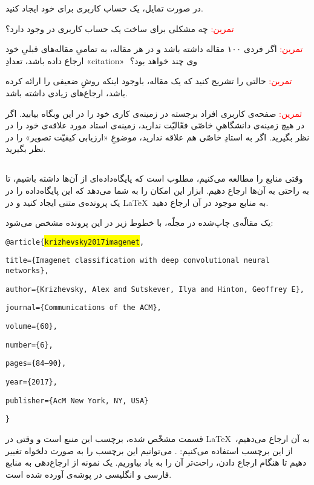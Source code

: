 \documentclass{article}
\begin{document}
\noindent در صورت تمایل، یک حساب کاربری برای خود ایجاد کنید.

\noindent \textcolor{red}{تمرین:} چه مشکلی برای ساخت یک حساب کاربری در \href{https://www.researchgate.net}{} وجود دارد؟

\noindent \textcolor{red}{تمرین:} اگر فردی ۱۰۰ مقاله داشته باشد و در هر مقاله، به تمامیِ مقاله‌های قبلیِ خود ارجاع داده باشد، تعدادِ «citation»  ِ وی چند خواهد بود؟

\noindent \textcolor{red}{تمرین:} حالتی را تشریح کنید که یک مقاله، باوجود اینکه روشِ ضعیفی را ارائه کرده باشد، ارجاع‌های زیادی داشته باشد.

\noindent \textcolor{red}{تمرین:} صفحه‌ی کاربری افراد برجسته در زمینه‌ی کاری خود را در این وبگاه بیابید. اگر در هیچ زمینه‌ی دانشگاهیِ خاصّی فعّالیّت ندارید، زمینه‌ی استاد مورد علاقه‌ی خود را در نظر بگیرید. اگر به استادِ خاصّی هم علاقه ندارید، موضوعِ «ارزیابی کیفیّت تصویر» را در نظر بگیرید.
\subsection{}
وقتی منابع را مطالعه می‌کنیم، مطلوب است که پایگاه‌داده‌ای از آن‌ها داشته باشیم، تا به راحتی به آن‌ها ارجاع دهیم. ابزار  این امکان را به شما می‌دهد که این پایگاه‌داده را در یک پرونده‌ی متنی ایجاد کنید و در \LaTeX~به منابع موجود در آن ارجاع دهید.

یک مقالّه‌ی چاپ‌شده در مجلّه، با خطوط زیر در این پرونده مشخص می‌شود:
\newline
\newline
\begin{latin}
\begin{small}
\noindent \texttt{@article\{\colorbox{yellow}{krizhevsky2017imagenet},}

\noindent \texttt{title=\{Imagenet classification with deep convolutional neural networks\},}

\noindent \texttt{author=\{Krizhevsky, Alex and Sutskever, Ilya and Hinton, Geoffrey E\},}

\noindent \texttt{journal=\{Communications of the ACM\},}

\noindent \texttt{volume=\{60\},}

\noindent \texttt{number=\{6\},}

\noindent \texttt{pages=\{84--90\},}

\noindent \texttt{year=\{2017\},}

\noindent \texttt{publisher=\{AcM New York, NY, USA\}}

\noindent \texttt{\}}
\end{small}
\end{latin}
\noindent قسمت مشخّص شده، برچسب این منبع است و وقتی در \LaTeX~به آن ارجاع می‌دهیم، از این برچسب استفاده می‌کنیم: . می‌توانیم این برچسب را به صورت دلخواه تغییر دهیم تا هنگام ارجاع دادن، راحت‌تر آن را به یاد بیاوریم. یک نمونه از ارجاع‌دهی به منابع فارسی و انگلیسی در پوشه‌ی  آورده شده است.
\end{document}
